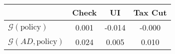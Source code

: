 \begin{tabular}{@{}lccc@{}}
\toprule
                          & Check      & UI    & Tax Cut    \\  \midrule
$\mathcal{G}(\text{policy})$ & 0.001  & -0.014  & -0.000     \\
$\mathcal{G}(AD,\text{policy})$ & 0.024  & 0.005  & 0.010     \\
\end{tabular}
